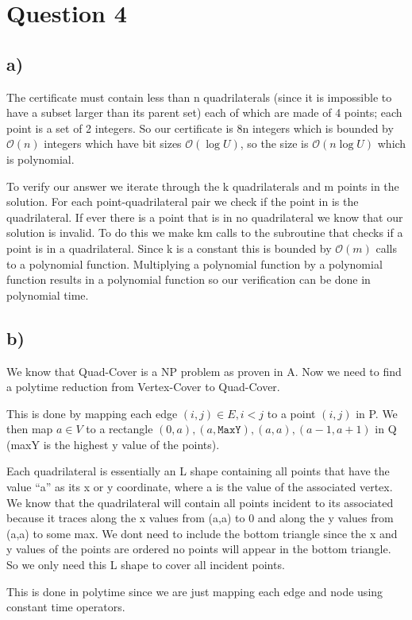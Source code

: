 \documentclass[12pt]{article}
\begin{document}
\section*{Question 4}
\subsection*{a)}
The certificate must contain less than n quadrilaterals (since it is impossible to have a subset larger than its parent set) each of which are made of 4 points; each point is a set of 2 integers. So our certificate is 8n integers which is bounded by $\mathcal{O}(n)$ integers which have bit sizes $\mathcal{O}(\log U)$, so the size is $\mathcal{O}(n\log U)$ which is polynomial.

To verify our answer we iterate through the k quadrilaterals and m points in the solution. For each point-quadrilateral pair we check if the point in is the quadrilateral. If ever there is a point that is in no quadrilateral we know that our solution is invalid. To do this we make km calls to the subroutine that checks if a point is in a quadrilateral. Since k is a constant this is bounded by $\mathcal{O}(m)$ calls to a polynomial function. Multiplying a polynomial function by a polynomial function results in a polynomial function so our verification can be done in polynomial time.

\subsection*{b)}
We know that Quad-Cover is a NP problem as proven in A. Now we need to find a polytime reduction from Vertex-Cover to Quad-Cover.

This is done by mapping each edge $(i,j)\in E, i<j$ to a point $(i,j)$ in P. We then map $a \in V$ to a rectangle $(0,a), (a, \texttt{MaxY}), (a,a), (a-1, a+1)$ in Q (maxY is the highest y value of the points).

Each quadrilateral is essentially an L shape containing all points that have the value ``a'' as its x or y coordinate, where a is the value of the associated vertex. We know that the quadrilateral will contain all points incident to its associated because it traces along the x values from (a,a) to 0 and along the y values from (a,a) to some max. We dont need to include the bottom triangle since the x and y values of the points are ordered no points will appear in the bottom triangle. So we only need this L shape to cover all incident points.

This is done in polytime since we are just mapping each edge and node using constant time operators.
\end{document}
